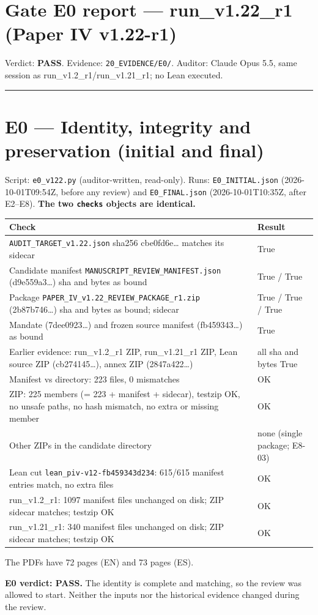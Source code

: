 \documentclass[
]{article}
\author{}
\date{}
\newcounter{none} %
\begin{document}
\section{Gate E0 report --- run\_v1.22\_r1 (Paper IV
v1.22-r1)}\label{gate-e0-report--run_v122_r1-paper-iv-v122-r1}

Verdict: \textbf{PASS}. Evidence: \texttt{20\_EVIDENCE/E0/}. Auditor:
Claude Opus 5.5, same session as run\_v1.2\_r1/run\_v1.21\_r1; no Lean
executed.

\begin{center}\rule{0.5\linewidth}{0.5pt}\end{center}

\section{E0 --- Identity, integrity and preservation (initial and
final)}\label{e0--identity-integrity-and-preservation-initial-and-final}

Script: \texttt{e0\_v122.py} (auditor-written, read-only). Runs:
\texttt{E0\_INITIAL.json} (2026-10-01T09:54Z, before any review) and
\texttt{E0\_FINAL.json} (2026-10-01T10:35Z, after E2--E8). \textbf{The
two \texttt{checks} objects are identical.}

{\def\LTcaptype{none} %
\begin{longtable}[]{@{}ll@{}}
\toprule\noalign{}
Check & Result \\
\midrule\noalign{}
\endhead
\bottomrule\noalign{}
\endlastfoot
\texttt{AUDIT\_TARGET\_v1.22.json} sha256 cbe0fd6e\ldots{} matches its
sidecar & True \\
Candidate manifest \texttt{MANUSCRIPT\_REVIEW\_MANIFEST.json}
(d9e559a3\ldots) sha and bytes as bound & True / True \\
Package \texttt{PAPER\_IV\_v1.22\_REVIEW\_PACKAGE\_r1.zip}
(2b87b746\ldots) sha and bytes as bound; sidecar & True / True / True \\
Mandate (7dee0923\ldots) and frozen source manifest (fb459343\ldots) as
bound & True \\
Earlier evidence: run\_v1.2\_r1 ZIP, run\_v1.21\_r1 ZIP, Lean source ZIP
(cb274145\ldots), annex ZIP (2847a422\ldots) & all sha and bytes True \\
Manifest vs directory: 223 files, 0 mismatches & OK \\
ZIP: 225 members (= 223 + manifest + sidecar), testzip OK, no unsafe
paths, no hash mismatch, no extra or missing member & OK \\
Other ZIPs in the candidate directory & none (single package; E8-03) \\
Lean cut \texttt{lean\_piv-v12-fb459343d234}: 615/615 manifest entries
match, no extra files & OK \\
run\_v1.2\_r1: 1097 manifest files unchanged on disk; ZIP sidecar
matches; testzip OK & OK \\
run\_v1.21\_r1: 340 manifest files unchanged on disk; ZIP sidecar
matches; testzip OK & OK \\
\end{longtable}
}

The PDFs have 72 pages (EN) and 73 pages (ES).

\textbf{E0 verdict: PASS.} The identity is complete and matching, so the
review was allowed to start. Neither the inputs nor the historical
evidence changed during the review.
\end{document}
